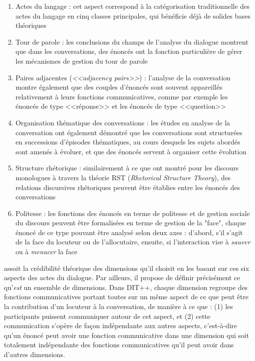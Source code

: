 \documentclass[10pt,a4paper,twoside]{article}
\begin{document}
\begin{enumerate}
	\item Actes du langage : cet aspect correspond à la catégorisation traditionnelle des actes du langage en cinq classes principales, qui bénéficie déjà de solides bases théoriques \cite{austin1975how}
	\item Tour de parole : les conclusions du champs de l'analyse du dialogue montrent que dans les conversations, des énoncés ont la fonction particulière de gérer les mécanismes de gestion du tour de parole \cite{shriberg2004icsi}
	\item Paires adjacentes (\textit{<<adjacency pairs>>}) : l'analyse de la conversation montre également que des couples d'énoncés sont souvent appareillés relativement à leurs fonctions communicatives, comme par exemple les énoncés de type <<réponse>> et les énoncés de type <<question>> \cite{levinson1983pragmatics,schegloff1973opening}
	\item Organisation thématique des conversations : les études en analyse de la conversation ont également démontré que les conversations sont structurées en successions d'épisodes thématiques, au cours desquels les sujets abordés sont amenés à évoluer, et que des énoncés servent à organiser cette évolution \cite{schegloff1973opening}
	\item Structure rhétorique : similairement à ce que \citet{thompson1987rhetorical} ont montré pour les discours monologues à travers la théorie RST (\textit{Rhetorical Structure Theory}), des relations discursives rhétoriques peuvent être établies entre les énoncés des conversations \cite{asher2003logics}
	\item Politesse : les fonctions des énoncés en terme de politesse et de gestion sociale du discours peuvent être formalisées en terme de gestion de la "face", chaque énoncé de ce type pouvant être analysé selon deux axes : d'abord, s'il s'agit de la face du locuteur ou de l'allocutaire, ensuite, si l'interaction vise à \textit{sauver} ou à \textit{menacer} la face \cite{brown1987politeness}
\end{enumerate}

\citeauthor{bunt2009dit++} assoit la crédibilité théorique des dimensions qu'il choisit en les basant sur ces six aspects des actes du dialogue. Par ailleurs, il propose de définir précisément ce qu'\textit{est} un ensemble de dimensions. Dans DIT++, chaque dimension regroupe des fonctions communicatives portant toutes sur un même aspect de ce que peut être la contribution d'un locuteur à la conversation, de manière à ce que : (1) les participants puissent communiquer autour de cet aspect, et (2) cette communication s'opère de façon indépendante aux autres aspects, c'est-à-dire qu'un énoncé peut avoir une fonction communicative dans une dimension qui soit totalement indépendante des fonctions communicatives qu'il peut avoir dans d'autres dimensions.
\end{document}
